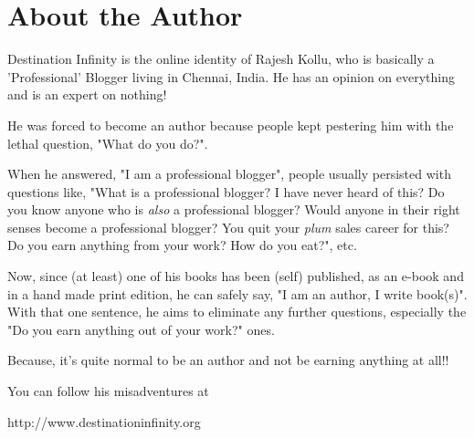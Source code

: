 \chapter{About the Author}

Destination Infinity is the online identity of Rajesh Kollu, who is basically a
'Professional' Blogger living in Chennai, India. He has an opinion on everything
and is an expert on nothing!

He was forced to become an author because people kept pestering him with the
lethal question, "What do you do?".

When he answered, "I am a professional blogger", people usually persisted with
questions like, "What is a professional blogger? I have never heard of this? Do
you know anyone who is \emph{also} a professional blogger? Would anyone in their
right senses become a professional blogger? You quit your \emph{plum} sales
career for this? Do you earn anything from your work? How do you eat?", etc.

Now, since (at least) one of his books has been (self) published, as an e-book
and in a hand made print edition, he can safely say, "I am an author, I write
book(s)". With that one sentence, he aims to eliminate any further questions,
especially the "Do you earn anything out of your work?" ones.

Because, it's quite normal to be an author and not be earning anything at all!! \faGrinBeam[regular]

You can follow his misadventures at

\vspace{1ex}

\centerline{http://www.destinationinfinity.org}